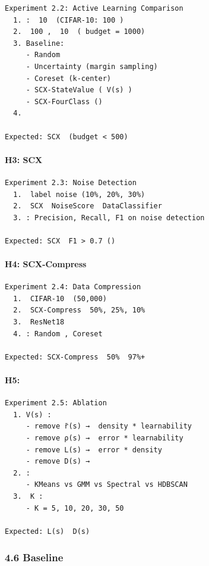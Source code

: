 \documentclass[
  12pt,
]{article}
\begin{document}
\begin{verbatim}
Experiment 2.2: Active Learning Comparison
  1. :  10  (CIFAR-10: 100 )
  2.  100 ,  10  ( budget = 1000)
  3. Baseline:
     - Random
     - Uncertainty (margin sampling)
     - Coreset (k-center)
     - SCX-StateValue ( V(s) )
     - SCX-FourClass ()
  4. 

Expected: SCX  (budget < 500) 
\end{verbatim}

\paragraph{H3: SCX
}\label{h3-scx-ux56dbux5206ux7c7bux6b63ux786eux8bc6ux522bux566aux58f0}

\begin{verbatim}
Experiment 2.3: Noise Detection
  1.  label noise (10%, 20%, 30%)
  2.  SCX  NoiseScore  DataClassifier 
  3. : Precision, Recall, F1 on noise detection

Expected: SCX  F1 > 0.7 ()
\end{verbatim}

\paragraph{H4: SCX-Compress
}\label{h4-scx-compress-ux6709ux6548ux538bux7f29ux8badux7ec3ux96c6}

\begin{verbatim}
Experiment 2.4: Data Compression
  1.  CIFAR-10  (50,000)
  2.  SCX-Compress  50%, 25%, 10%
  3.  ResNet18
  4. : Random , Coreset 

Expected: SCX-Compress  50%  97%+ 
\end{verbatim}

\paragraph{H5: }\label{h5-ux6d88ux878dux7814ux7a76}

\begin{verbatim}
Experiment 2.5: Ablation
  1. V(s) :
     - remove r̄(s) →  density * learnability
     - remove ρ(s) →  error * learnability
     - remove L(s) →  error * density
     - remove D(s) → 
  2. :
     - KMeans vs GMM vs Spectral vs HDBSCAN
  3.  K :
     - K = 5, 10, 20, 30, 50

Expected: L(s)  D(s) 
\end{verbatim}

\subsubsection{4.6 Baseline
}\label{baseline-ux5b8cux6574ux5217ux8868}
\end{document}
